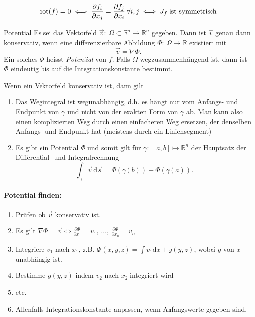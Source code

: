 \documentclass[a4paper,10pt]{article}
\def\R{\mathbb{R}}
\DeclareMathOperator{\rot}{rot}
\begin{document}
\[
    \rot(f) = 0 \iff \pdv{f_i}{x_j} = \pdv{f_j}{x_i} \; \forall i, j \iff J_f \text{ ist symmetrisch}
\]

\begin{mainbox}{Potential}
    Es sei das Vektorfeld \( \vec{v}: \: \Omega \subset \R^n \to \R^n \) gegeben. Dann ist \( \vec{v} \) genau dann konservativ, wenn eine differenzierbare Abbildung \( \Phi: \: \Omega \to \R \) existiert mit \[
        \vec{v} = \nabla \Phi \text{.}
    \]
    Ein solches \( \Phi \) heisst \emph{Potential} von \( f \). Falls \( \Omega \) wegzusammenhängend ist, dann ist \( \Phi \) eindeutig bis auf die Integrationskonstante bestimmt.
\end{mainbox}

Wenn ein Vektorfeld konservativ ist, dann gilt
\begin{enumerate}
    \item Das Wegintegral ist wegunabhängig, d.h. es hängt nur vom Anfangs- und Endpunkt von \( \gamma \) und nicht von der exakten Form von \( \gamma \) ab. Man kann also einen komplizierten Weg durch einen einfacheren Weg ersetzen, der denselben Anfangs- und Endpunkt hat (meistens durch ein Liniensegment).
    \item Es gibt ein Potential \( \Phi \) und somit gilt für \( \gamma: \: [a, b] \mapsto \R^n \) der Hauptsatz der Differential- und Integralrechnung
    \[
        \int_\gamma \vec{v} \, \mathrm{d}\vec{s} = \Phi(\gamma(b)) - \Phi(\gamma(a)) \text{.}
    \]
\end{enumerate}

\paragraph{Potential finden:}
\begin{enumerate}
    \item Prüfen ob \( \vec{v} \) konservativ ist.
    \item Es gilt \( \nabla \Phi = \vec{v} \iff \frac{\partial \Phi}{\partial x_1} = v_1, \, \dots, \, \frac{\partial \Phi}{\partial x_n} = v_n \)
    \item Integriere \( v_1 \) nach \( x_1 \), z.B. \( \Phi(x, y, z) = \int v_1 \mathrm{d}x + g(y, z) \), wobei \( g \) von \( x \) unabhängig ist.
    \item Bestimme \( g(y, z) \) indem \( v_2 \) nach \( x_2 \) integriert wird
    \item etc.
    \item Allenfalls Integrationskonstante anpassen, wenn Anfangswerte gegeben sind.
\end{enumerate}
\end{document}
